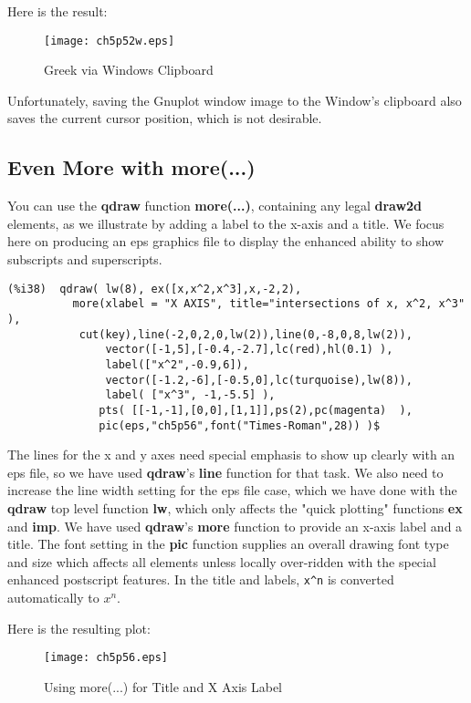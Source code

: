 \documentclass[12pt]{article}
\begin{document}
Here is the result:
\begin{figure} [h]
   \centerline{\texttt{[image: ch5p52w.eps]} }
	\caption{Greek via Windows Clipboard}
\end{figure}      
  
\newpage

Unfortunately, saving the Gnuplot window image to the Window's clipboard
  also saves the current cursor position, which is not desirable.

\subsection{Even More with more(...) }
You can use the \textbf{qdraw} function \textbf{more(...)}, containing any legal \textbf{draw2d}
  elements, as we illustrate by adding a label to the x-axis and a title.
We focus here on producing an eps graphics file to display the enhanced ability to
  show subscripts and superscripts.
\small
\begin{verbatim}
(%i38)  qdraw( lw(8), ex([x,x^2,x^3],x,-2,2),
          more(xlabel = "X AXIS", title="intersections of x, x^2, x^3" ),
		   cut(key),line(-2,0,2,0,lw(2)),line(0,-8,0,8,lw(2)),
               vector([-1,5],[-0.4,-2.7],lc(red),hl(0.1) ),
               label(["x^2",-0.9,6]),
               vector([-1.2,-6],[-0.5,0],lc(turquoise),lw(8)),
               label( ["x^3", -1,-5.5] ),
              pts( [[-1,-1],[0,0],[1,1]],ps(2),pc(magenta)  ),
              pic(eps,"ch5p56",font("Times-Roman",28)) )$
\end{verbatim}
\normalsize
The lines for the x and y axes need special emphasis to show up clearly with
  an eps file, so we have used \textbf{qdraw}'s \textbf{line} function for
  that task.
We also need to increase the line width setting for the eps file case, which
  we have done with the \textbf{qdraw} top level function \textbf{lw}, which
  only affects the "quick plotting" functions \textbf{ex} and \textbf{imp}.
We have used \textbf{qdraw}'s \textbf{more} function to provide an x-axis
  label and a title.
The font setting in the \textbf{pic} function supplies an overall drawing
  font type and size which affects all elements unless locally over-ridden
  with the special enhanced postscript features.
In the title and labels, \verb|x^n| is converted automatically to $x^n$.
\smallskip

Here is the resulting plot:
\begin{figure} [h]
   \centerline{\texttt{[image: ch5p56.eps]} }
	\caption{Using more(...) for Title and X Axis Label}
\end{figure}      
\end{document}
